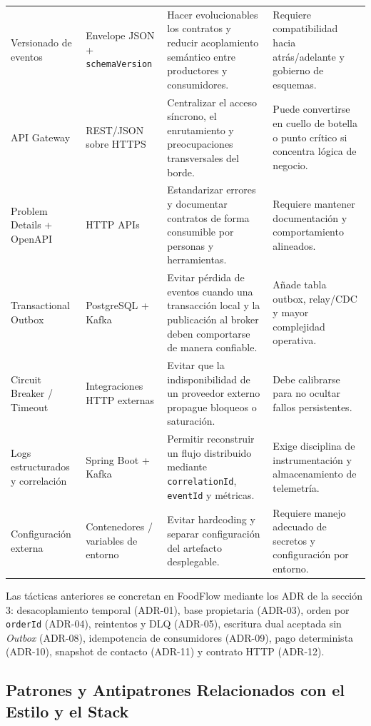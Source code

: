 \documentclass[12pt,a4paper]{article}
\begin{document}
\begin{longtable}{P{0.16\textwidth} P{0.18\textwidth} P{0.36\textwidth} P{0.20\textwidth}}
Versionado de eventos & Envelope JSON + \texttt{schemaVersion} & Hacer evolucionables los contratos y reducir acoplamiento semántico entre productores y consumidores. & Requiere compatibilidad hacia atrás/adelante y gobierno de esquemas. \\
API Gateway & REST/JSON sobre HTTPS & Centralizar el acceso síncrono, el enrutamiento y preocupaciones transversales del borde. & Puede convertirse en cuello de botella o punto crítico si concentra lógica de negocio. \\
Problem Details + OpenAPI & HTTP APIs & Estandarizar errores y documentar contratos de forma consumible por personas y herramientas. & Requiere mantener documentación y comportamiento alineados. \\
Transactional Outbox & PostgreSQL + Kafka & Evitar pérdida de eventos cuando una transacción local y la publicación al broker deben comportarse de manera confiable. & Añade tabla outbox, relay/CDC y mayor complejidad operativa. \\
Circuit Breaker / Timeout & Integraciones HTTP externas & Evitar que la indisponibilidad de un proveedor externo propague bloqueos o saturación. & Debe calibrarse para no ocultar fallos persistentes. \\
Logs estructurados y correlación & Spring Boot + Kafka & Permitir reconstruir un flujo distribuido mediante \texttt{correlationId}, \texttt{eventId} y métricas. & Exige disciplina de instrumentación y almacenamiento de telemetría. \\
Configuración externa & Contenedores / variables de entorno & Evitar hardcoding y separar configuración del artefacto desplegable. & Requiere manejo adecuado de secretos y configuración por entorno. \\
\bottomrule
\end{longtable}
\setlength{\tabcolsep}{6pt}
\normalsize

Las tácticas anteriores se concretan en FoodFlow mediante los ADR de la sección 3: desacoplamiento temporal (ADR-01), base propietaria (ADR-03), orden por \texttt{orderId} (ADR-04), reintentos y DLQ (ADR-05), escritura dual aceptada sin \textit{Outbox} (ADR-08), idempotencia de consumidores (ADR-09), pago determinista (ADR-10), snapshot de contacto (ADR-11) y contrato HTTP (ADR-12).

\subsection{Patrones y Antipatrones Relacionados con el Estilo y el Stack}
\end{document}
